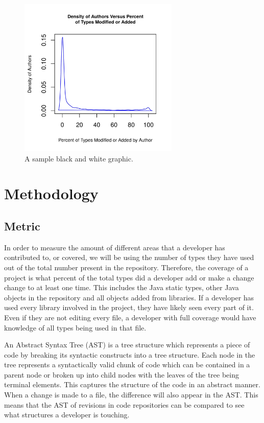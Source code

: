 \documentclass{sig-alternate-05-2015}
\begin{document}
\begin{figure}[t]
\centering
\includegraphics[height=3in, width=3in]{../lib_stats_dist}
\caption{A sample black and white graphic.}
\label{lib_stats_dist}
\end{figure}

\section{Methodology}
\subsection{Metric}
In order to measure the amount of different areas that a developer has contributed to, or covered, we will be using the number of types they have used out of the total number present in the repository. Therefore, the coverage of a project is what percent of the total types did a developer add or make a change change to at least one time. This includes the Java static types, other Java objects in the repository and all objects added from libraries. If a developer has used every library involved in the project, they have likely seen every part of it. Even if they are not editing every file, a developer with full coverage would have knowledge of all types being used in that file. 

An Abstract Syntax Tree (AST) is a tree structure which represents a piece of code by breaking its syntactic constructs into a tree structure. Each node in the tree represents a syntactically valid chunk of code which can be contained in a parent node or broken up into child nodes with the leaves of the tree being terminal elements. This captures the structure of the code in an abstract manner. When a change is made to a file, the difference will also appear in the AST. This means that the AST of revisions in code repositories can be compared to see what structures a developer is touching. 
\end{document}
